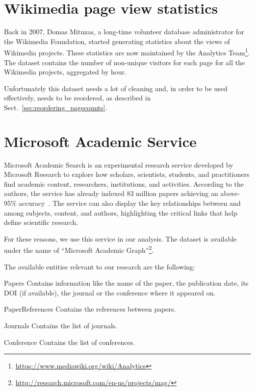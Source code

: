 \section{Wikimedia page view statistics}
\label{sec:pagecounts}
Back in 2007, Domas Mituzas, a long-time volunteer database administrator for the Wikimedia Foundation, started generating statistics about the views of Wikimedia projects.
These statistics are now maintained by the Analytics Team\footnote{\url{https://www.mediawiki.org/wiki/Analytics}}.
The dataset contains the number of non-unique visitors for each page for all the Wikimedia projects, aggregated by hour.

Unfortunately this dataset needs a lot of cleaning and, in order to be used effectively, needs to be reordered, as described in Sect.~\ref{sec:reordering_pagecounts}.

\section{Microsoft Academic Service}
\label{sec:mag}
Microsoft Academic Search is an experimental research service developed by Microsoft Research to explore how scholars, scientists, students, and practitioners find academic content, researchers, institutions, and activities.
According to the authors, the service has already indexed 83 million papers achieving an above-95\% accuracy~\cite{Sinha2015}.
The service can also display the key relationships between and among subjects, content, and authors, highlighting the critical links that help define scientific research.

For these reasons, we use this service in our analysis.
The dataset is available under the name of ``Microsoft Academic Graph''\footnote{\url{http://research.microsoft.com/en-us/projects/mag/}}.

The available entities relevant to our research are the following:
\begin{description*}
    \item[Papers] Contains information like the name of the paper, the publication date, its \ac{DOI} (if available), the journal or the conference where it appeared on.
    \item[PaperReferences] Contains the references between papers.
    \item[Journals] Contains the list of journals.
    \item[Conference] Contains the list of conferences.
\end{description*}


